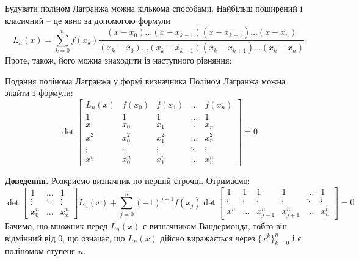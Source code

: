 \documentclass[14pt]{extarticle}
\begin{document}
Будувати поліном Лагранжа можна кількома способами. Найбільш поширений і класичний -- це явно за допомогою формули
\[
L_n(x) = \sum_{k=0}^n f(x_k) \frac{(x-x_0)\dots (x-x_{k-1})(x-x_{k+1})\dots(x-x_n)}{(x_k-x_0)\dots (x_k-x_{k-1})(x_k-x_{k+1})\dots(x_k-x_n)}
\]
Проте, також, його можна знаходити із наступного рівняння:
\begin{theorem*}{Подання полінома Лагранжа у формі визначника}
Поліном Лагранжа можна знайти з формули:
\[
\det\begin{bmatrix}
    L_n(x) & f(x_0) & f(x_1) & \dots & f(x_n) \\
    1 & 1 & 1 & \dots & 1 \\
    x & x_0 & x_1 & \dots & x_n \\
    x^2 & x_0^2 & x_1^2 & \dots & x_n^2 \\
    \vdots & \vdots & \vdots & \ddots & \vdots \\
    x^n & x_0^n & x_1^n & \dots & x_n^n 
\end{bmatrix} = 0
\]
\end{theorem*}

\textbf{Доведення.} Розкриємо визначник по першій строчці. Отримаємо:
\[
\det\begin{bmatrix}
    1 & \dots & 1 \\
    \vdots & \ddots & \vdots \\
    x_0^n & \dots & x_n^n
\end{bmatrix}L_n(x) + \sum_{j=0}^n (-1)^{j+1}f(x_j)\det\begin{bmatrix}
    1 & 1 & 1 & 1 & \dots & 1 \\
    \vdots & \vdots & \vdots & \vdots & \ddots & \vdots \\
    x^n & \dots & x_{j-1}^n & x_{j+1}^n & \dots & x_n^n
\end{bmatrix} = 0
\]
Бачимо, що множник перед $L_n(x)$ є визначником Вандермонда, тобто він відмінний від $0$, що означає, що $L_n(x)$ дійсно виражається через $\{x^k\}_{k=0}^n$ і є поліномом ступеня $n$.
\end{document}
